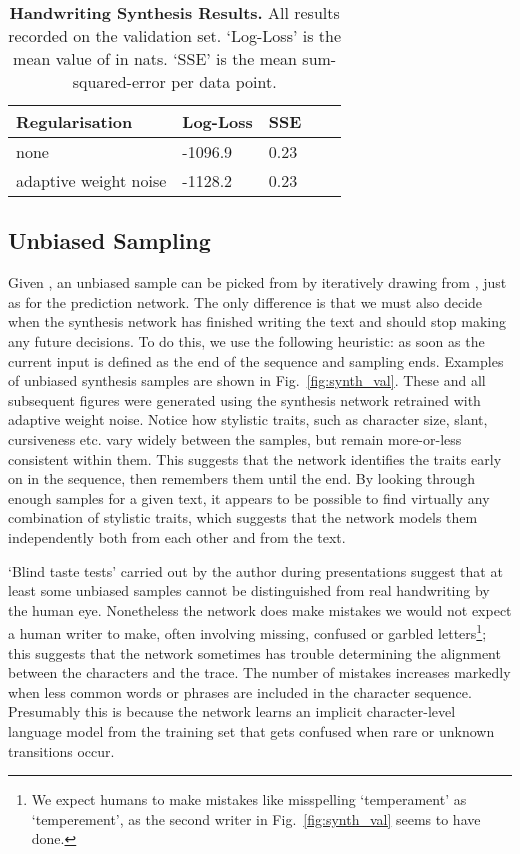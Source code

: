 \documentclass{article}
\newcommand{\tlabel}[1]{\label{tab:#1}}
\newcommand{\fref}[1]{Fig.~\ref{fig:#1}}
\newcommand{\capt}[2]{\caption[#1]{\textbf{#1}#2}}
\begin{document}
\begin{table}
\centering
\capt{Handwriting Synthesis Results.}{ All results recorded on the validation set. `Log-Loss' is the mean value of  in nats. `SSE' is the mean sum-squared-error per data point.}
\tlabel{hand_synth}
\vskip 0.15in
\begin{center}
\begin{sc}
\begin{tabular}{lllll}
\hline
Regularisation &Log-Loss & SSE\\
\hline
none & -1096.9  & 0.23\\
adaptive weight noise & -1128.2 & 0.23\\
\hline
\end{tabular}
\end{sc}
\end{center}
\vskip -0.1in
\end{table}



\subsection{Unbiased Sampling}
Given , an unbiased sample can be picked from  by iteratively drawing  from , just as for the prediction network.
The only difference is that we must also decide when the synthesis network has finished writing the text and should stop making any future decisions.
To do this, we use the following heuristic: as soon as  the current input  is defined as the end of the sequence and sampling ends.
Examples of unbiased synthesis samples are shown in \fref{synth_val}.
These and all subsequent figures were generated using the synthesis network retrained with adaptive weight noise. 
Notice how stylistic traits, such as character size, slant, cursiveness etc. vary widely between the samples, but remain more-or-less consistent within them.
This suggests that the network identifies the traits early on in the sequence, then remembers them until the end.
By looking through enough samples for a given text, it appears to be possible to find virtually any combination of stylistic traits, which suggests that the network models them independently both from each other and from the text.

`Blind taste tests' carried out by the author during presentations suggest that at least some unbiased samples cannot be distinguished from real handwriting by the human eye. 
Nonetheless the network does make mistakes we would not expect a human writer to make, often involving missing, confused or garbled letters\footnote{We expect humans to make mistakes like misspelling `temperament' as `temperement', as the second writer in \fref{synth_val} seems to have done.}; this suggests that the network sometimes has trouble determining the alignment between the characters and the trace.
The number of mistakes increases markedly when less common words or phrases are included in the character sequence.
Presumably this is because the network learns an implicit character-level language model from the training set that gets confused when rare or unknown transitions occur.
\end{document}
